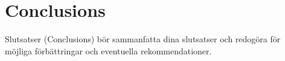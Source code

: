 \chapter{Conclusions} \label{ch:conclusions}
Slutsatser (Conclusions) bör sammanfatta dina slutsatser och redogöra för möjliga förbättringar och eventuella rekommendationer.